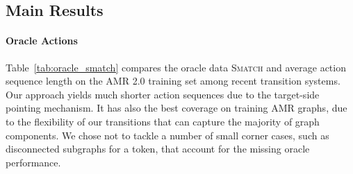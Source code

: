\subsection{Main Results}\label{results:main}

\begin{table}[]
    \centering
     \caption{Average number of actions and oracle \textsc{Smatch} on AMR 2.0 training data. The average source length is 18.9.
     from author correspondence.}
\label{tab:oracle_smatch}
\end{table}


\paragraph{Oracle Actions}
Table~\ref{tab:oracle_smatch} compares the oracle data \textsc{Smatch} and average action sequence length on the AMR 2.0 training set among recent transition systems.
Our approach yields much shorter action sequences due to the target-side pointing mechanism. It has also the best coverage on training AMR graphs, due to the flexibility of our transitions that can capture the majority of graph components. We chose not to tackle a number of small corner cases, such as disconnected subgraphs for a token, that account for the missing oracle performance.

